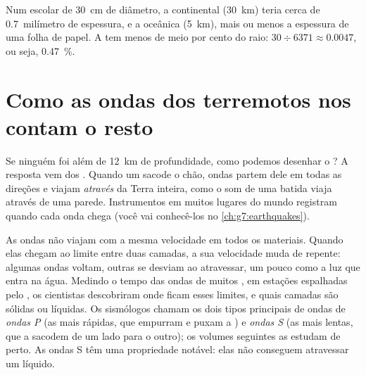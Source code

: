 \begin{remark}\label{rem:g6:inside-the-earth:thin-crust}
Num  escolar de 30~cm de diâmetro, a  continental (30~km) teria
cerca de 0.7~milímetro de espessura, e a  oceânica (5~km), mais ou
menos a espessura de uma folha de papel. A  tem menos de meio por
cento do raio: $30 \div 6371 \approx 0.0047$, ou seja, 0.47~\%.
\end{remark}

\section{Como as ondas dos terremotos nos contam o resto}\label{sec:g6:inside-the-earth:waves}

Se ninguém foi além de 12~km de profundidade, como podemos desenhar o
? A resposta vem dos . Quando um  sacode o chão,
ondas partem dele em todas as direções e viajam \emph{através} da Terra
inteira, como o som de uma batida viaja através de uma parede. Instrumentos em muitos lugares do mundo registram quando cada onda chega (você vai conhecê-los no
\cref{ch:g7:earthquakes}).

As ondas não viajam com a mesma velocidade em todos os materiais. Quando
elas chegam ao limite entre duas camadas, a sua velocidade muda de
repente: algumas ondas voltam, outras se desviam ao atravessar, um pouco
como a luz que entra na água. Medindo o tempo das ondas de muitos , em estações espalhadas pelo , os cientistas descobriram onde ficam esses limites, e
quais camadas são sólidas ou líquidas. Os sismólogos chamam os dois tipos
principais de ondas de \emph{ondas P} (as mais rápidas, que empurram e
puxam a ) e \emph{ondas S} (as mais lentas, que a sacodem de um lado
para o outro); os volumes seguintes as estudam de perto. As ondas S têm uma
propriedade notável: elas não conseguem atravessar um líquido.

